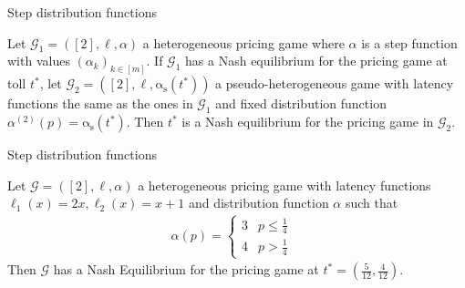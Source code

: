 \documentclass{beamer}
\newcommand{\as}{\mathrm{\alpha_s}}
\newcommand{\Gm}{\mathcal{G}}
\begin{document}
\begin{frame}{Step distribution functions}
	\begin{theorem}
		Let $\Gm_1 = ([2], \ell, \alpha)$ a heterogeneous pricing game where $\alpha$ is a step function with values $(\alpha_k)_{k \in [m]}$.
		If $\Gm_1$ has a Nash equilibrium for the pricing game at toll $t^*$, let $\Gm_2 = ([2], \ell, \as(t^*))$ a pseudo-heterogeneous game with latency functions the same as the ones in $\Gm_1$ and fixed distribution function $\alpha^{(2)}(p) = \as(t^*)$.
		Then $t^*$ is a Nash equilibrium for the pricing game in $\Gm_2$.
	\end{theorem}
\end{frame}

\begin{frame}{Step distribution functions}
	\begin{example}
		Let $\Gm = ([2], \ell, \alpha)$ a heterogeneous pricing game with latency functions $\ell_1(x) = 2x, \ell_2(x) = x + 1$ and distribution function $\alpha$ such that
		\begin{align*}
			\alpha(p) =
			\begin{cases}
				3 & p \le \tfrac14 \\
				4 & p > \tfrac14
			\end{cases}&
		\end{align*}
		Then $\Gm$ has a Nash Equilibrium for the pricing game at $t^* = \left(\tfrac{5}{12}, \tfrac{4}{12}\right)$.
	\end{example}
\end{frame}
\end{document}
